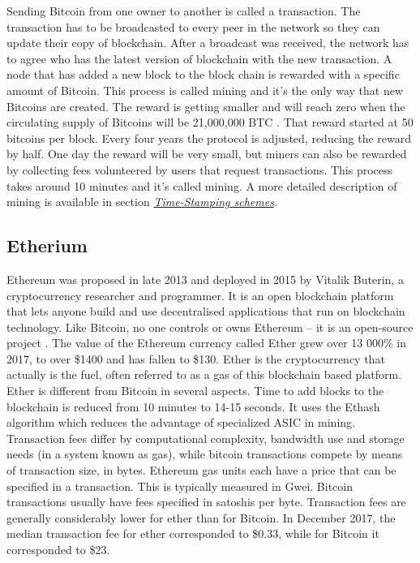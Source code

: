 Sending Bitcoin from one owner to another is called a transaction. The transaction has to be broadcasted to every peer in the network so they can update their copy of blockchain. After a broadcast was received, the network has to agree who has the latest version of blockchain with the new transaction. A node that has added a new block to the block chain is rewarded with a specific amount of Bitcoin. This process is called mining and it's the only way that new Bitcoins are created. The reward is getting smaller and will reach zero when the circulating supply of Bitcoins will be 21,000,000 BTC \cite{coinmarketcap_btc}. That reward started at 50 bitcoins per block. Every four years the protocol is adjusted, reducing the reward by half. One day the reward will be very small, but miners can also be rewarded by collecting fees volunteered by users that request transactions. This process takes around 10 minutes and it's called mining. A more detailed description of mining is available in section \hyperref[timestamping]{\textit{Time-Stamping schemes}}. 

\subsection{Etherium}
Ethereum was proposed in late 2013 and deployed in 2015 by Vitalik Buterin, a cryptocurrency researcher and programmer. It is an open blockchain platform that lets anyone build and use decentralised applications that run on blockchain technology. Like Bitcoin, no one controls or owns Ethereum – it is an open-source project \cite{eth_docs}.
The value of the Ethereum currency called Ether grew over 13 000\% in 2017, to over \$1400 and has fallen to \$130\cite{coinmarketcap}. Ether is the cryptocurrency that actually is the fuel, often referred to as a gas of this blockchain based platform. 
Ether is different from Bitcoin in several aspects. Time to add blocks to the blockchain is reduced from 10 minutes to 14-15 seconds. It uses the Ethash algorithm which reduces the advantage of specialized ASIC in mining. Transaction fees differ by computational complexity, bandwidth use and storage needs (in a system known as gas), while bitcoin transactions compete by means of transaction size, in bytes. Ethereum gas units each have a price that can be specified in a transaction. This is typically measured in Gwei. Bitcoin transactions usually have fees specified in satoshis per byte. Transaction fees are generally considerably lower for ether than for Bitcoin. In December 2017, the median transaction fee for ether corresponded to \$0.33, while for Bitcoin it corresponded to \$23. 


